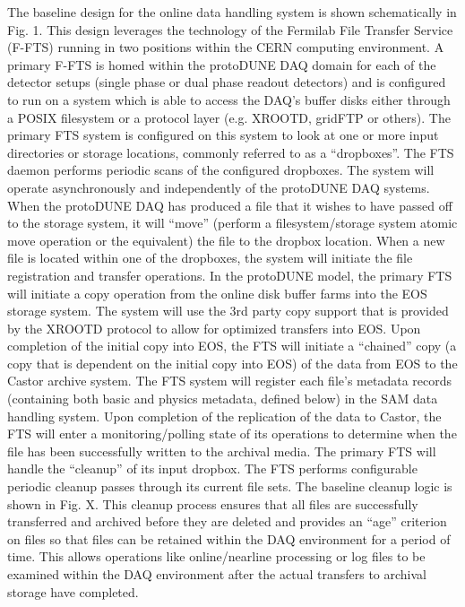The baseline design for the online data handling system is shown schematically in Fig. 1.  This design leverages the technology of the Fermilab File Transfer Service (F-FTS) running in two positions within the CERN computing environment.  A primary F-FTS is homed within the protoDUNE DAQ domain for each of the detector setups (single phase or dual phase readout detectors) and is configured to run on a system which is able to access the DAQ’s buffer disks either through a POSIX filesystem or a protocol layer (e.g. XROOTD, gridFTP or others).  The primary FTS system is configured on this system to look at one or more input directories or storage locations, commonly referred to as a “dropboxes”.  The FTS daemon performs periodic scans of the configured dropboxes.  The system will operate asynchronously and independently of the protoDUNE DAQ systems.  When the protoDUNE DAQ has produced a file that it wishes to have passed off to the storage system, it will “move” (perform a filesystem/storage system atomic move operation or the equivalent) the file to the dropbox location. When a new file is located within one of the dropboxes, the system will initiate the file registration and transfer operations.
In the protoDUNE model, the primary FTS will initiate a copy operation from the online disk buffer farms into the EOS storage system.  The system will use the 3rd party copy support that is provided by the XROOTD protocol to allow for optimized transfers into EOS.  Upon completion of the initial copy into EOS, the FTS will initiate a “chained” copy (a copy that is dependent on the initial copy into EOS) of the data from EOS to the Castor archive system.  The FTS system will register each file’s metadata records (containing both basic and physics metadata, defined below)  in the SAM data handling system.  Upon completion of the replication of the data to Castor, the FTS will enter a monitoring/polling state of its operations to determine when the file has been successfully written to the archival media.
The primary FTS will handle the “cleanup” of its input dropbox.  The FTS performs configurable periodic cleanup passes through its current file sets.  The baseline cleanup logic is shown in Fig. X.  This cleanup process ensures that all files are successfully transferred and archived before they are deleted and provides an “age” criterion on files so that files can be retained within the DAQ environment for a period of time.  This allows operations like online/nearline processing or log files to be examined within the DAQ environment after the actual transfers to archival storage have completed.
